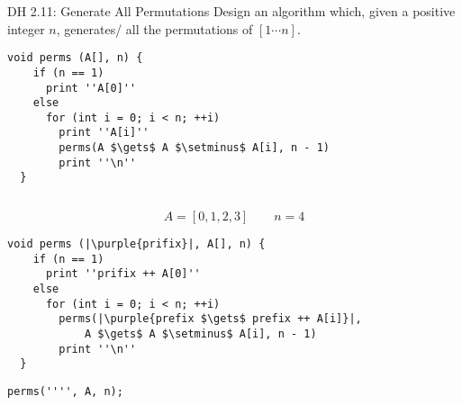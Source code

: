 \begin{frame}[fragile]{}
  \begin{exampleblock}{DH 2.11: Generate All Permutations}
    Design an algorithm which, given a positive integer $n$,
    generates/ all the permutations of $[1 \cdots n]$.
  \end{exampleblock}

  \pause
  \begin{lstlisting}[style = Cstyle]
  void perms (A[], n) {
    if (n == 1)
      print ''A[0]''
    else 
      for (int i = 0; i < n; ++i)
        print ''A[i]''
        perms(A $\gets$ A $\setminus$ A[i], n - 1)
        print ''\n''
  }
  \end{lstlisting}

  \vspace{0.30cm}
  \pause
  \centerline{\texttt{}}
\end{frame}

\begin{frame}{}
  \begin{columns}
    \pause
  \end{columns}
\end{frame}

\begin{frame}{}
  \[
    A = [0,1,2,3] \qquad n = 4
  \]
\end{frame}

\begin{frame}[fragile]{}
  \begin{lstlisting}[style = Cstyle]
  void perms (|\purple{prifix}|, A[], n) {
    if (n == 1)
      print ''prifix ++ A[0]''
    else 
      for (int i = 0; i < n; ++i)
        perms(|\purple{prefix $\gets$ prefix ++ A[i]}|, 
            A $\gets$ A $\setminus$ A[i], n - 1)
        print ''\n''
  }
  \end{lstlisting}

  \pause
  \begin{lstlisting}[style = Cstyle]
  perms('''', A, n);
  \end{lstlisting}
\end{frame}

\begin{frame}{}
  \begin{columns}
  \end{columns}
\end{frame}

